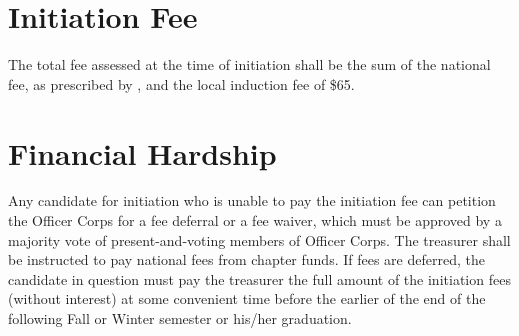 \section{Initiation Fee}
The total fee assessed at the time of initiation shall be the sum of the national fee, as prescribed  by \hkn, and the local induction fee of \$65.

\section{Financial Hardship}
Any candidate for initiation who is unable to pay the initiation fee can petition the Officer Corps for a fee deferral or a fee waiver, which must be approved by a majority vote of present-and-voting members of Officer Corps. The treasurer shall be instructed to pay national fees from chapter funds. If fees are deferred, the candidate in question must pay the treasurer the full amount of the initiation fees (without interest) at some convenient time before the earlier of the end of the following Fall or Winter semester or his/her graduation.
